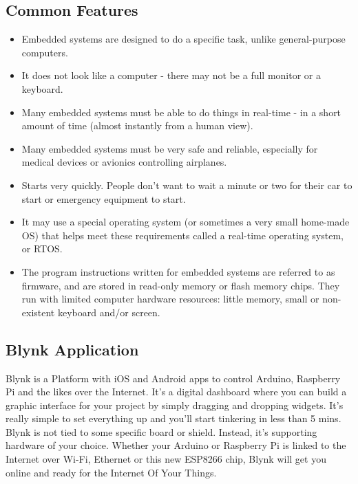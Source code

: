\documentclass[twoside,a4paper,16pt]{book}
\begin{document}
{{			\subsection*{Common Features}
			\begin{itemize}
				\item Embedded systems are designed to do a specific task, unlike general-purpose computers.
				\item It does not look like a computer - there may not be a full monitor or a keyboard.
				\item Many embedded systems must be able to do things in real-time - in a short amount of time (almost instantly from a human view).
				\item Many embedded systems must be very safe and reliable, especially for medical devices or avionics controlling airplanes.
				\item Starts very quickly. People don't want to wait a minute or two for their car to start or emergency equipment to start.
				\item It may use a special operating system (or sometimes a very small home-made OS) that helps meet these requirements called a real-time operating system, or RTOS.
				\item The program instructions written for embedded systems are referred to as firmware, and are stored in read-only memory or flash memory chips. They run with limited computer hardware resources: little memory, small or non-existent keyboard and/or screen.\\	
			\end{itemize}
			\subsection{Blynk Application}
			Blynk is a Platform with iOS and Android apps to control Arduino, Raspberry Pi and the likes over the Internet. It’s a digital dashboard where you can build a graphic interface for your project by simply dragging and dropping widgets. It’s really simple to set everything up and you’ll start tinkering in less than 5 mins. Blynk is not tied to some specific board or shield. Instead, it’s supporting hardware of your choice. Whether your Arduino or Raspberry Pi is linked to the Internet over Wi-Fi, Ethernet or this new ESP8266 chip, Blynk will get you online and ready for the Internet Of Your Things.
			
}}
\end{document}
